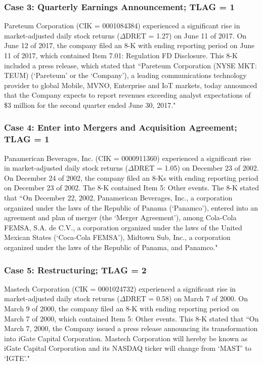 \subsubsection*{Case 3: Quarterly Earnings Announcement; TLAG = 1}
Pareteum Corporation (CIK = 0001084384) experienced a significant rise in market-adjusted daily stock returns ($\Delta$DRET = 1.27) on June 11 of 2017. On June 12 of 2017, the company filed an 8-K with ending reporting period on June 11 of 2017, which contained Item 7.01: Regulation FD Disclosure. This 8-K included a press release, which stated that ``Pareteum Corporation (NYSE MKT: TEUM) (`Pareteum' or the `Company'), a leading communications technology provider to global Mobile, MVNO, Enterprise and IoT markets, today announced that the Company expects to report revenues exceeding analyst expectations of \$3 million for the second quarter ended June 30, 2017."
\subsubsection*{Case 4: Enter into Mergers and Acquisition Agreement; TLAG = 1}
Panamerican Beverages, Inc. (CIK = 0000911360) experienced a significant rise in market-adjusted daily stock returns ($\Delta$DRET = 1.05) on December 23 of 2002. On December 24 of 2002, the company filed an 8-Ks with ending reporting period on December 23 of 2002. The 8-K contained Item 5: Other events. The 8-K stated that ``On December 22, 2002, Panamerican Beverages, Inc., a corporation organized under the laws of the Republic of Panama (`Panamco'), entered into an agreement and plan of merger (the `Merger Agreement'), among Cola-Cola FEMSA, S.A. de C.V., a corporation organized under the laws of the United Mexican States (`Coca-Cola FEMSA'), Midtown Sub, Inc., a corporation organized under the laws of the Republic of Panama, and Panamco."
\subsubsection*{Case 5: Restructuring; TLAG = 2}
Mastech Corporation (CIK = 0001024732) experienced a significant rise in market-adjusted daily stock returns ($\Delta$DRET = 0.58) on March 7 of 2000. On March 9 of 2000, the company filed an 8-K with ending reporting period on March 7 of 2000, which contained Item 5: Other events. This 8-K stated that ``On March 7, 2000, the Company issued a press release announcing its transformation into iGate Capital Corporation. Mastech Corporation will hereby be known as iGate Capital Corporation and its NASDAQ ticker will change from `MAST' to `IGTE'."

